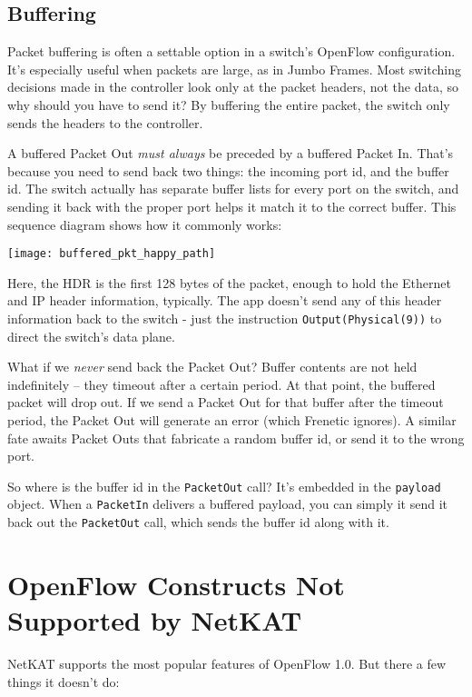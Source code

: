 \subsection{Buffering}
\label{intro:buffering}

Packet buffering is often a settable option in a switch's OpenFlow configuration.  It's 
especially useful when packets are large, as in Jumbo Frames.  Most switching decisions made in 
the controller look only at the packet headers, not the data, so why should you have to send it?  By buffering the
entire packet, the switch only sends the headers to the controller.  

A buffered Packet Out \emph{must always} be preceded by a buffered Packet In.  That's because you need 
to send back two things:
the incoming port id, and the buffer id.  The switch actually has separate buffer lists 
for every port on the switch, and 
sending it back with the proper port helps it match it to the correct buffer.   
This sequence diagram shows how it commonly works:

\texttt{[image: buffered\_pkt\_happy\_path]}

Here, the HDR is the first 128 bytes of the packet, enough to hold the Ethernet and IP header information,
typically.  The app doesn't send any of this header information back to the switch - just the instruction
\texttt{Output(Physical(9))} to direct the switch's data plane.

What if we \emph{never} send back the Packet Out?  Buffer contents are not held indefinitely -- they timeout after a 
certain period.  At that point, the buffered packet will drop out.
If we send a Packet Out for that buffer after the timeout period, the Packet Out will generate an error (which
Frenetic ignores).    A similar fate awaits Packet Outs that fabricate a random buffer id, or send it to the
wrong port.  

So where is the buffer id in the \texttt{PacketOut} call?  It's embedded in the \texttt{payload} object.
When a \texttt{PacketIn} delivers a buffered payload, you can simply it send it back out the \texttt{PacketOut}
call, which sends the buffer id along with it.  

\section{OpenFlow Constructs Not Supported by NetKAT}

NetKAT supports the most popular features of OpenFlow 1.0.  But there a few things it doesn't do:

